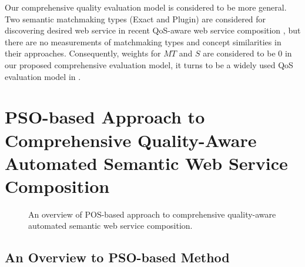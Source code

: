 \documentclass{llncs}
\begin{document}
Our comprehensive quality evaluation model is considered to be more general. Two semantic matchmaking types (Exact and Plugin) are considered for discovering desired web service in recent QoS-aware web service composition  \cite{ma2015hybrid,da2016particle,da2015graphevol}, but there are no measurements of matchmaking types and concept similarities in their approaches. Consequently, weights for $MT$ and $S$ are considered to be 0 in our proposed comprehensive evaluation model, it turns to be a widely used QoS evaluation model in \cite{ma2015hybrid,da2016particle,da2015graphevol}.


\section{PSO-based Approach to Comprehensive Quality-Aware Automated Semantic Web Service Composition}\label{qswsc_approach}

\begin{figure}[h]
\centering
{}
 \caption{An overview of POS-based approach to comprehensive quality-aware automated semantic web service composition.}
 \label{overview}
\end{figure}


\subsection{An Overview to PSO-based Method}\label{PSO_based_approach}
\end{document}
